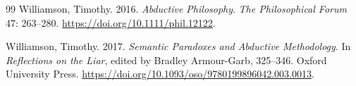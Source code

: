 \documentclass[12pt,letterpaper]{article}
\begin{document}
\begin{thebibliography}{99}
Williamson, Timothy. 2016. \emph{Abductive Philosophy}. \emph{The Philosophical Forum} 47: 263--280. \url{https://doi.org/10.1111/phil.12122}.

Williamson, Timothy. 2017. \emph{Semantic Paradoxes and Abductive Methodology}. In \emph{Reflections on the Liar}, edited by Bradley Armour-Garb, 325--346. Oxford University Press. \url{https://doi.org/10.1093/oso/9780199896042.003.0013}.
\end{thebibliography}
\end{document}
